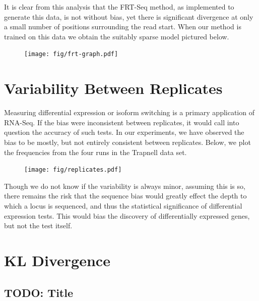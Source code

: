 \documentclass[letterpaper]{article}
\begin{document}
It is clear from this analysis that the FRT-Seq method, as implemented to
generate this data, is not without bias, yet there is significant divergence at
only a small number of positions surrounding the read start. When our method is
trained on this data we obtain the suitably sparse model pictured below.

\begin{figure}[H]
\begin{center}
\texttt{[image: fig/frt-graph.pdf]}
\end{center}
\label{fig:trimmedfreqs}
\end{figure}


\section{Variability Between Replicates}

Measuring differential expression or isoform switching is a primary application of
RNA-Seq. If the bias were inconsistent between replicates, it would call into
question the accuracy of such tests. In our experiments, we have observed the
bias to be mostly, but not entirely consistent between replicates. Below, we
plot the frequencies from the four runs in the Trapnell data set.

\begin{figure}[H]
\begin{center}
\texttt{[image: fig/replicates.pdf]}
\end{center}
\label{fig:trimmedfreqs}
\end{figure}

Though we do not know if the variability is always minor, assuming this is so,
there remains the risk that the sequence bias would greatly effect the depth to
which a locus is sequenced, and thus the statistical significance of
differential expression tests. This would bias the discovery of differentially
expressed genes, but not the test itself.


\section{KL Divergence}

\subsection{TODO: Title}
\end{document}
